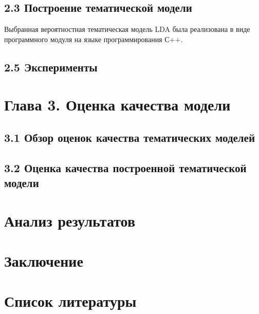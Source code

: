 \documentclass[a4paper]{report}
\begin{document}
	\subsection{2.3 Построение тематической модели}
	
	Выбранная вероятностная тематическая модель LDA была реализована в виде программного модуля на языке программирования  С++. 
	
	\subsection{2.5 Эксперименты}
	
	
	\newpage
	\section{Глава 3. Оценка качества модели}
	\subsection{3.1 Обзор оценок качества тематических моделей}
	\subsection{3.2 Оценка качества построенной тематической модели}
	
	
	\newpage
	\section{Анализ результатов}
	
	
	\newpage
	\section{Заключение}
	
	
	
	\newpage
	\section{Список литературы}
	
\end{document}
